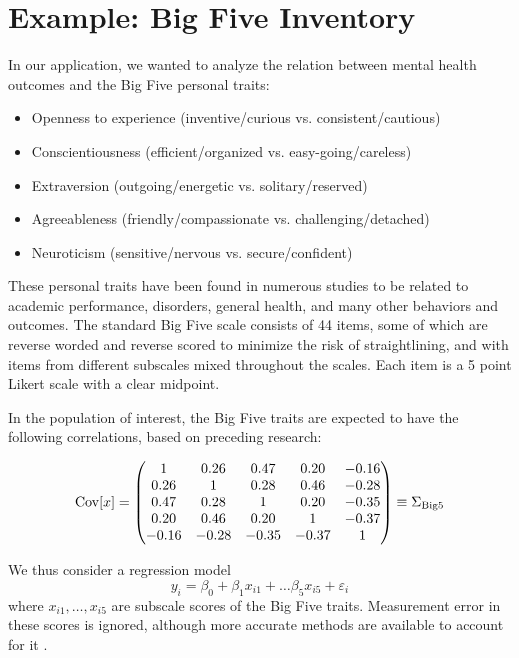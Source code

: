 \documentclass[11pt]{asaproc}
\begin{document}
\section{Example: Big Five Inventory}

In our application, we wanted to analyze the relation between mental health outcomes
and the Big Five personal traits:

\begin{itemize}
    \item Openness to experience (inventive/curious vs. consistent/cautious)
    \item Conscientiousness (efficient/organized vs. easy-going/careless)
    \item Extraversion (outgoing/energetic vs. solitary/reserved)
    \item Agreeableness (friendly/compassionate vs. challenging/detached)
    \item Neuroticism (sensitive/nervous vs. secure/confident)
\end{itemize}

These personal traits have been found in numerous studies to be related to academic performance, disorders, general health,
and many other behaviors and outcomes. The standard Big Five scale consists of 44 items,
some of which are reverse worded and reverse scored to minimize the risk of straightlining, and with
items from different subscales mixed throughout the scales. Each item is a 5 point Likert scale with a clear midpoint.

In the population of interest, the Big Five traits are expected to have the following correlations, based
on preceding research:

\begin{equation}\label{eq:bigfive:corr}
  {\rm Cov}[x] =
  \begin{pmatrix}
    1    & 0.26 & 0.47 & 0.20 & -0.16 \\
    0.26 & 1    & 0.28 & 0.46 & -0.28 \\
    0.47 & 0.28 & 1    & 0.20 & -0.35 \\
    0.20 & 0.46 & 0.20 & 1    & -0.37 \\
    -0.16 & -0.28 & -0.35 & -0.37 & 1
  \end{pmatrix}
  \equiv
  \Sigma_{\rm Big 5}
\end{equation}

We thus consider a regression model
$$
    y_i = \beta_0 + \beta_1 x_{i1} + \ldots \beta_5 x_{i5} + \varepsilon_i
$$
where $x_{i1},\ldots,x_{i5}$ are subscale scores of the Big Five traits.
Measurement error in these scores is ignored, although more accurate methods are
available to account for it \citep{skrondal:laake:2001}.
\end{document}
